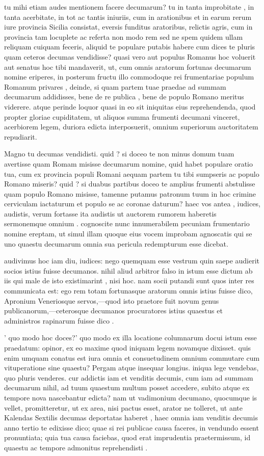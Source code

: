  tu mihi etiam audes mentionem facere decumarum? tu in tanta improbitate , in tanta acerbitate, in tot ac tantis iniuriis, cum in arationibus et in earum rerum iure provincia Sicilia consistat, eversis funditus aratoribus, relictis agris, cum in provincia tam locuplete ac referta non modo rem sed ne spem quidem ullam reliquam cuiquam feceris, aliquid te populare putabis habere cum dices te pluris quam ceteros decumas vendidisse? quasi vero aut populus Romanus hoc voluerit aut senatus hoc tibi mandaverit, ut, cum omnis aratorum fortunas decumarum nomine eriperes, in posterum fructu illo commodoque rei frumentariae populum Romanum privares , deinde, si quam partem tuae praedae ad summam decumarum addidisses, bene de re publica , bene de populo Romano meritus viderere. atque perinde loquor quasi in eo sit iniquitas eius reprehendenda, quod propter gloriae cupiditatem, ut aliquos summa frumenti decumani vinceret, acerbiorem legem, duriora edicta interposuerit, omnium superiorum auctoritatem repudiarit.

 Magno tu decumas vendidisti. quid ? si doceo te non minus domum tuam avertisse quam Romam misisse decumarum nomine, quid habet populare oratio tua, cum ex provincia populi Romani aequam partem tu tibi sumpseris ac populo Romano miseris? quid ? si duabus partibus doceo te amplius frumenti abstulisse quam populo Romano misisse, tamenne putamus patronum tuum in hoc crimine cerviculam iactaturum et populo se ac coronae daturum? haec vos antea , iudices, audistis, verum fortasse ita audistis ut auctorem rumorem haberetis sermonemque omnium . cognoscite nunc innumerabilem pecuniam frumentario nomine ereptam, ut simul illam quoque eius vocem improbam agnoscatis qui se uno quaestu decumarum omnia sua pericula redempturum esse dicebat.

 audivimus hoc iam diu, iudices: nego quemquam esse vestrum quin saepe audierit socios istius fuisse decumanos. nihil aliud arbitror falso in istum esse dictum ab iis qui male de isto existimarint , nisi hoc. nam socii putandi sunt quos inter res communicata est: ego rem totam fortunasque aratorum omnis istius fuisse dico, Apronium Veneriosque servos,—quod isto praetore fuit novum genus publicanorum,—ceterosque decumanos procuratores istius quaestus et administros rapinarum fuisse dico .

 ' quo modo hoc doces?' quo modo ex illa locatione columnarum docui istum esse praedatum: opinor, ex eo maxime quod iniquam legem novamque dixisset. quis enim umquam conatus est iura omnia et consuetudinem omnium commutare cum vituperatione sine quaestu? Pergam atque insequar longius. iniqua lege vendebas, quo pluris venderes. cur addictis iam et venditis decumis, cum iam ad summam decumarum nihil, ad tuum quaestum multum posset accedere, subito atque ex tempore nova nascebantur edicta? nam ut vadimonium decumano, quocumque is vellet, promitteretur, ut ex area, nisi pactus esset, arator ne tolleret, ut ante Kalendas Sextilis decumas deportatas haberet , haec omnia iam venditis decumis anno tertio te edixisse dico; quae si rei publicae causa faceres, in vendundo essent pronuntiata; quia tua causa faciebas, quod erat imprudentia praetermissum, id quaestu ac tempore admonitus reprehendisti .

